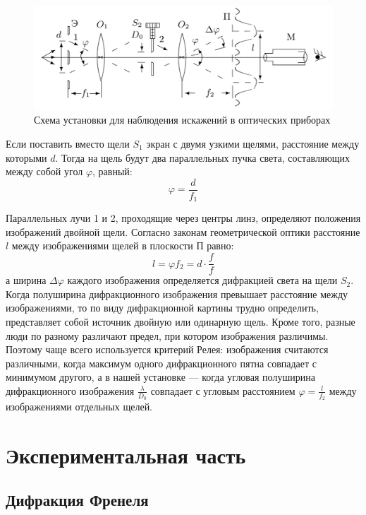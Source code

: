 \documentclass[a4paper,12pt]{article}
\begin{document}
		\begin{figure}[h!]
			\label{fren}
			\includegraphics[width = 0.7\linewidth]{razr}
			\centering
			\caption{Схема установки для наблюдения искажений в оптических приборах}
		\end{figure}
		
		Если поставить вместо щели $S_1$ экран с двумя узкими щелями, расстояние между которыми $d$. Тогда на щель будут	два параллельных пучка света, составляющих между собой угол $\varphi$, равный:
		\begin{equation}
			\varphi = \frac{d}{f_1}
		\end{equation}
		
		Параллельных лучи 1 и 2, проходящие через центры линз, определяют положения изображений двойной щели. Согласно законам геометрической оптики расстояние $l$ между изображениями щелей в плоскости П равно:
		\begin{equation}
			l = \varphi f_2 = d \cdot \frac{f}{f}
		\end{equation}
		а ширина $\Delta\varphi$ каждого изображения определяется дифракцией света на щели $S_2$. Когда полуширина дифракционного изображения превышает расстояние между изображениями, то по виду дифракционной картины трудно определить, представляет собой источник двойную или одинарную щель. Кроме того, разные люди по разному различают предел, при котором изображения различимы. Поэтому чаще всего используется критерий Релея: изображения считаются различными, когда максимум одного дифракционного пятна совпадает с минимумом другого, а в нашей установке --- когда угловая полуширина дифракционного изображения $\frac{\lambda}{D_0}$ совпадает с угловым расстоянием $\varphi = \frac{l}{f_2}$ между изображениями отдельных щелей.
				
		
		\section{Экспериментальная часть}
		\subsection{Дифракция Френеля}
		
\end{document}
